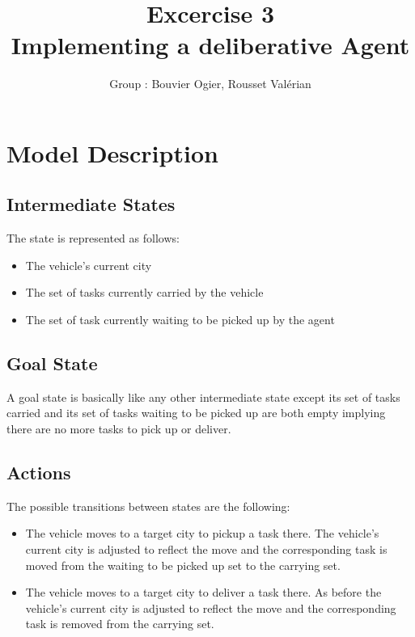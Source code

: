 \documentclass[11pt]{article}
\title{\bf Excercise 3\\ Implementing a deliberative Agent}
\author{Group \textnumero 17 : Bouvier Ogier, Rousset Valérian}
\begin{document}
\maketitle

\section{Model Description}

\subsection{Intermediate States}
The state is represented as follows:
\begin{itemize}
  \item The vehicle's current city
  \item The set of tasks currently carried by the vehicle
  \item The set of task currently waiting to be picked up by the agent
\end{itemize}

\subsection{Goal State}


A goal state is basically like any other intermediate state except
its set of tasks carried and its set of tasks waiting to be picked up
are both empty implying there are no more tasks to pick up or deliver.

\subsection{Actions}

The possible transitions between states are the following:

\begin{itemize}
    \item The vehicle moves to a target city to pickup a task there.
      The vehicle's current city is adjusted to reflect the move and the
      corresponding task is moved from the waiting to be picked up set to
      the carrying set.
    \item The vehicle moves to a target city to deliver a task there.
      As before the vehicle's current city is adjusted to reflect the
      move and the corresponding task is removed from the carrying
      set.
\end{itemize}
\end{document}
